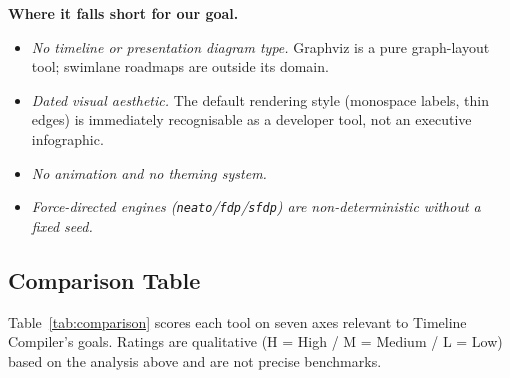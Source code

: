 \medskip\noindent
\textbf{Where it falls short for our goal.}
\begin{itemize}
  \item \emph{No timeline or presentation diagram type.}
        Graphviz is a pure graph-layout tool; swimlane roadmaps are outside
        its domain.
  \item \emph{Dated visual aesthetic.}
        The default rendering style (monospace labels, thin edges) is
        immediately recognisable as a developer tool, not an executive
        infographic.
  \item \emph{No animation and no theming system.}
  \item \emph{Force-directed engines (\texttt{neato}/\texttt{fdp}/\texttt{sfdp})
        are non-deterministic without a fixed seed.}
\end{itemize}

\subsection{Comparison Table}
\label{sec:comparison-table}

Table~\ref{tab:comparison} scores each tool on seven axes relevant to
Timeline Compiler's goals.
Ratings are qualitative (H = High / M = Medium / L = Low) based on the
analysis above and are not precise benchmarks.

